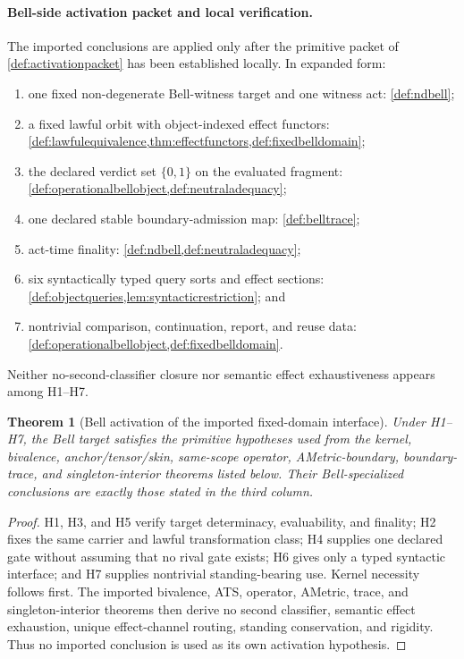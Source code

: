 \documentclass[11pt]{article}
\newtheorem{theorem}{Theorem}[section]
\theoremstyle{definition}
\begin{document}
\paragraph{Bell-side activation packet and local verification.}
The imported conclusions are applied only after the primitive packet of \cref{def:activationpacket} has been established locally. In expanded form:
\begin{enumerate}[label=(H\arabic*),leftmargin=3em]
\item one fixed non-degenerate Bell-witness target and one witness act: \cref{def:ndbell};
\item a fixed lawful orbit with object-indexed effect functors: \cref{def:lawfulequivalence,thm:effectfunctors,def:fixedbelldomain};
\item the declared verdict set $\{0,1\}$ on the evaluated fragment: \cref{def:operationalbellobject,def:neutraladequacy};
\item one declared stable boundary-admission map: \cref{def:belltrace};
\item act-time finality: \cref{def:ndbell,def:neutraladequacy};
\item six syntactically typed query sorts and effect sections: \cref{def:objectqueries,lem:syntacticrestriction}; and
\item nontrivial comparison, continuation, report, and reuse data: \cref{def:operationalbellobject,def:fixedbelldomain}.
\end{enumerate}
Neither no-second-classifier closure nor semantic effect exhaustiveness appears among H1--H7.

\begin{theorem}[Bell activation of the imported fixed-domain interface]\label{thm:importactivation}
Under H1--H7, the Bell target satisfies the primitive hypotheses used from the kernel, bivalence, anchor/tensor/skin, same-scope operator, AMetric-boundary, boundary-trace, and singleton-interior theorems listed below. Their Bell-specialized conclusions are exactly those stated in the third column.
\end{theorem}
\begin{proof}
H1, H3, and H5 verify target determinacy, evaluability, and finality; H2 fixes the same carrier and lawful transformation class; H4 supplies one declared gate without assuming that no rival gate exists; H6 gives only a typed syntactic interface; and H7 supplies nontrivial standing-bearing use. Kernel necessity follows first. The imported bivalence, ATS, operator, AMetric, trace, and singleton-interior theorems then derive no second classifier, semantic effect exhaustion, unique effect-channel routing, standing conservation, and rigidity. Thus no imported conclusion is used as its own activation hypothesis.
\end{proof}
\end{document}
